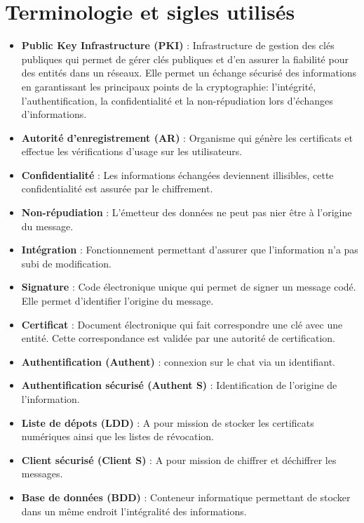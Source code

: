 \documentclass[a4paper,11pt,french]{article}
\begin{document}
\section{Terminologie et sigles utilisés}
\begin{itemize}
\item \textbf{Public Key Infrastructure (PKI)} : Infrastructure de gestion des clés publiques qui permet de gérer clés publiques et d'en assurer la fiabilité pour des entités dans un réseaux. Elle permet un échange sécurisé des informations en garantissant les principaux points de la cryptographie: l'intégrité, l'authentification, la confidentialité et la non-répudiation lors d'échanges d'informations.
\item \textbf{Autorité d'enregistrement (AR)} : Organisme qui génère les certificats et effectue les vérifications d'usage sur les utilisateurs.
\item \textbf{Confidentialité} : Les informations échangées deviennent illisibles, cette confidentialité est assurée par le chiffrement.
\item \textbf{Non-répudiation} : L'émetteur des données ne peut pas nier être à l'origine du message.
\item \textbf{Intégration} : Fonctionnement permettant d'assurer que l'information n'a pas subi de modification.
\item \textbf{Signature} : Code électronique unique qui permet de signer un message codé. Elle permet d'identifier l'origine du message.
\item \textbf{Certificat} : Document électronique qui fait correspondre une clé avec une entité. Cette correspondance est validée par une autorité de certification.
\item \textbf{Authentification (Authent)} : connexion sur le chat via un identifiant.
\item \textbf{Authentification sécurisé (Authent S)} : Identification de l'origine de l'information.
\item \textbf{Liste de dépots (LDD)} :  A pour mission de stocker les certificats numériques ainsi que les listes de révocation. 
\item \textbf{Client sécurisé (Client S)} :  A pour mission de chiffrer et déchiffrer les messages.
\item \textbf{Base de données (BDD)} : Conteneur informatique permettant de stocker dans un même endroit l'intégralité des informations.

\end{itemize}
\end{document}

